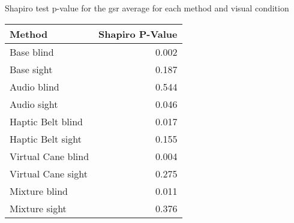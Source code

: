 
\centering
\caption{Shapiro test p-value for the gsr average for each method and visual condition}
\label{tab:shapiro_gsr_avg}
\begin{tabular}{lr}
\toprule
            Method &  Shapiro P-Value \\
\midrule
        Base blind &            0.002 \\
        Base sight &            0.187 \\
       Audio blind &            0.544 \\
       Audio sight &            0.046 \\
 Haptic Belt blind &            0.017 \\
 Haptic Belt sight &            0.155 \\
Virtual Cane blind &            0.004 \\
Virtual Cane sight &            0.275 \\
     Mixture blind &            0.011 \\
     Mixture sight &            0.376 \\
\bottomrule
\end{tabular}
